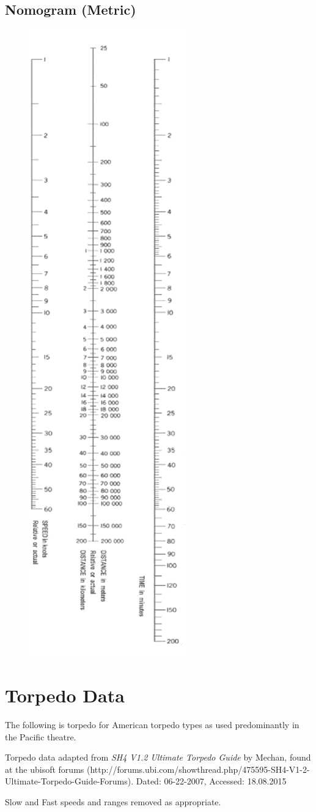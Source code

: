 \documentclass{article}
\begin{document}
\subsection{Nomogram (Metric)}
\vspace{24pt}
\begin{figure}
\includegraphics[height=\textwidth, angle=90]{nomo-metric}
\label{nomo-metric}
\end{figure}
\pagebreak

\section{Torpedo Data}
The following is torpedo for American torpedo types as used predominantly in the Pacific theatre.

Torpedo data adapted from \emph{SH4 V1.2 Ultimate Torpedo Guide} by Mechan, found at the ubisoft forums (http://forums.ubi.com/showthread.php/475595-SH4-V1-2-Ultimate-Torpedo-Guide-Forums). Dated: 06-22-2007, Accessed: 18.08.2015

Slow and Fast speeds and ranges removed as appropriate.
\end{document}
